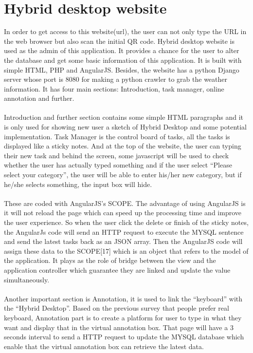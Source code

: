\section{Hybrid desktop website}
In order to get access to this website(url), the user can not only type the URL in the web browser but also scan the initial QR code. Hybrid desktop website is used as the admin of this application. It provides a chance for the user to alter the database and get some basic information of this application. It is built with simple HTML, PHP and AngularJS. Besides, the website has a python Django server whose port is 8080 for making a python crawler to grab the weather information. It has four main sections: Introduction, task manager, online annotation and further.
\\
\\
Introduction and further section contains some simple HTML paragraphs and it is only used for showing new user a sketch of Hybrid Desktop and some potential implementation. Task Manager is the control board of tasks, all the tasks is displayed like a sticky notes. And at the top of the website, the user can typing their new task and behind the screen, some javascript will be used to check whether the user has actually typed something and if the user select “Please select your category”, the user will be able to enter his/her new category, but if he/she selects something, the input box will hide. 
\\
\\
These are coded with AngularJS’s SCOPE. The advantage of using AngularJS is it will not reload the page which can speed up the processing time and improve the user experience. So when the user click the delete or finish of the sticky notes, the AngularJs code will send an HTTP request to execute the MYSQL sentence and send the latest tasks back as an JSON array. Then the AngularJS code will assign these data to the SCOPE[17] which is an object that refers to the model of the application. It plays as the role of bridge between the view and the application controller which guarantee they are linked and update the value simultaneously.
\\
\\
Another important section is Annotation, it is used to link the “keyboard” with the “Hybrid Desktop”. Based on the previous survey that people prefer real keyboard, Annotation part is to create a platform for user to type in what they want and display that in the virtual annotation box. That page will have a 3 seconds interval to send a HTTP request to update the MYSQL database which enable that the virtual annotation box can retrieve the latest data. 
